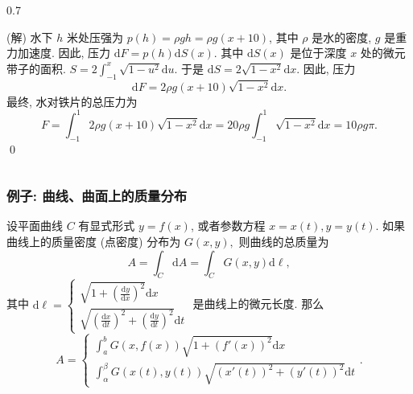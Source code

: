 \begin{frame}
\begin{columns}
\begin{column}{0.7\textwidth}
\pause

\startproof[bg=yellow, fg=red](解)
水下 $h$ 米处压强为 $p(h) = \rho g h = \rho g (x + 10)$, 其中 $\rho$ 是水的密度, $g$ 是重力加速度. 因此, 压力 $\mathrm{d}F = p(h) \mathrm{d}S(x)$. 其中 $\mathrm{d}S(x)$ 是位于深度 $x$ 处的微元带子的面积.
\pause
$S = 2\int_{-1}^x \sqrt{1-u^2} \mathrm{d}u$. 于是 $\mathrm{d} S = 2 \sqrt{1-x^2} \mathrm{d}x$. 因此, 压力
\[
\mathrm{d}F = 2 \rho g (x + 10) \sqrt{1-x^2} \mathrm{d}x.
\]
最终, 水对铁片的总压力为
\[
F = \int_{-1}^1 2 \rho g (x + 10) \sqrt{1-x^2} \mathrm{d}x = 20 \rho g \int_{-1}^1 \sqrt{1-x^2} \mathrm{d}x = 10 \rho g \pi.
\]
\qed
\end{column}
\end{columns}

\end{frame}


\begin{frame}
\frametitle{例子: 曲线、曲面上的质量分布}

设平面曲线 $C$ 有显式形式 $y = f(x)$, 或者参数方程 $x = x(t), y = y(t)$. 如果曲线上的质量密度 (点密度) 分布为 $G(x, y),$ 则曲线的总质量为
\[
A = \int_C \mathrm{d}A = \int_C G(x, y) \mathrm{d}\ell,
\]
其中 $\mathrm{d}\ell = \begin{cases} \sqrt{1 + \left(\frac{\mathrm{d}y}{\mathrm{d}x}\right)^2} \mathrm{d}x \\ \sqrt{\left(\frac{\mathrm{d}x}{\mathrm{d}t}\right)^2 + \left(\frac{\mathrm{d}y}{\mathrm{d}t}\right)^2} \mathrm{d}t \end{cases}$ 是曲线上的微元长度. 那么
\[
A = \begin{cases} \int_a^b G(x, f(x)) \sqrt{1 + (f'(x))^2} \mathrm{d}x \\ \int_\alpha^\beta G(x(t), y(t)) \sqrt{(x'(t))^2 + (y'(t))^2} \mathrm{d}t \end{cases}.
\]

\end{frame}


